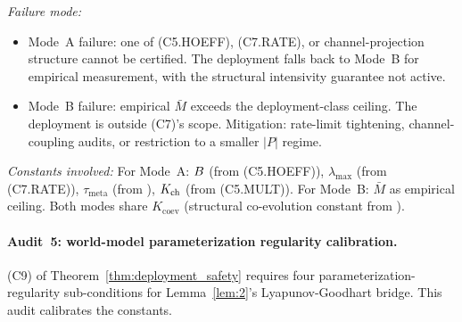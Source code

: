 \emph{Failure mode:}
\begin{itemize}
\item Mode~A failure: one of (C5.HOEFF), (C7.RATE), or
  channel-projection structure cannot be certified.  The
  deployment falls back to Mode~B for empirical measurement,
  with the structural intensivity guarantee not active.
\item Mode~B failure: empirical $\bar{M}$ exceeds the
  deployment-class ceiling.  The deployment is outside (C7)'s
  scope.  Mitigation: rate-limit tightening, channel-coupling
  audits, or restriction to a smaller $|P|$ regime.
\end{itemize}

\emph{Constants involved:} For Mode~A: $B$ (from
(C5.HOEFF)), $\lambda_{\max}$ (from (C7.RATE)),
$\tau_{\mathrm{meta}}$ (from
\citep[Phase Redundancy]{lasser2026phase}), $K_{\mathrm{ch}}$ (from (C5.MULT)).
For Mode~B: $\bar{M}$ as empirical ceiling.  Both modes share
$K_{\mathrm{coev}}$ (structural co-evolution constant from
\citep[Microfoundation]{lasser2026micro}).

\paragraph{Audit~5: world-model parameterization regularity calibration.}

(C9) of Theorem~\ref{thm:deployment_safety} requires four
parameterization-regularity sub-conditions for Lemma~\ref{lem:2}'s
Lyapunov-Goodhart bridge.  This audit calibrates the constants.

